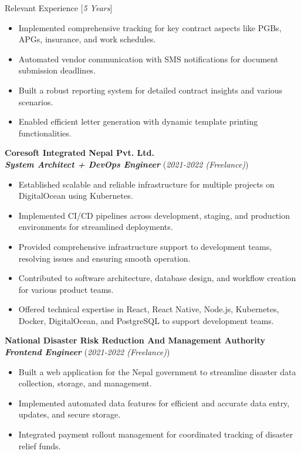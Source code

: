 \documentclass{resume} %
\begin{document}
\begin{rSection}{Relevant Experience [\textit{5 Years}]}
\begin{enumerate}
\begin{itemize}
                  \item Implemented comprehensive tracking for key contract aspects like PGBs, APGs, insurance, and work schedules.
                  \item Automated vendor communication with SMS notifications for document submission deadlines.
                  \item Built a robust reporting system for detailed contract insights and various scenarios.
                  \item Enabled efficient letter generation with dynamic template printing functionalities.
              \end{itemize}
    \end{enumerate}

    \large{{\bf Coresoft Integrated Nepal Pvt. Ltd.}}
    \\ \small{\textit{\textbf{System Architect + DevOps Engineer}}} (\small{\textit{2021-2022 (Freelance)}})

    \begin{itemize}
        \item Established scalable and reliable infrastructure for multiple projects on DigitalOcean using Kubernetes.
        \item Implemented CI/CD pipelines across development, staging, and production environments for streamlined deployments.
        \item Provided comprehensive infrastructure support to development teams, resolving issues and ensuring smooth operation.
        \item Contributed to software architecture, database design, and workflow creation for various product teams.
        \item Offered technical expertise in React, React Native, Node.js, Kubernetes, Docker, DigitalOcean, and PostgreSQL to support development teams.
    \end{itemize}

    \large{{\bf National Disaster Risk Reduction And Management Authority}}
    \\ \small{\textit{\textbf{Frontend Engineer}}} (\small{\textit{2021-2022 (Freelance)}})

    \begin{itemize}
        \item Built a web application for the Nepal government to streamline disaster data collection, storage, and management.
        \item Implemented automated data features for efficient and accurate data entry, updates, and secure storage.
        \item Integrated payment rollout management for coordinated tracking of disaster relief funds.
    \end{itemize}



\end{rSection}
\end{document}
